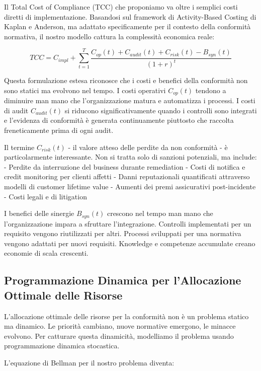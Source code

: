 Il Total Cost of Compliance (TCC) che proponiamo va oltre i semplici costi diretti di implementazione. Basandosi sul framework di Activity-Based Costing di Kaplan e Anderson\autocite{Kaplan2007}, ma adattato specificamente per il contesto della conformità normativa, il nostro modello cattura la complessità economica reale:

\begin{equation}
TCC = C_{impl} + \sum_{t=1}^{T} \frac{C_{op}(t) + C_{audit}(t) + C_{risk}(t) - B_{syn}(t)}{(1+r)^t}
\label{eq:tcc_extended}
\end{equation}

Questa formulazione estesa riconosce che i costi e benefici della conformità non sono statici ma evolvono nel tempo. I costi operativi $C_{op}(t)$ tendono a diminuire man mano che l'organizzazione matura e automatizza i processi. I costi di audit $C_{audit}(t)$ si riducono significativamente quando i controlli sono integrati e l'evidenza di conformità è generata continuamente piuttosto che raccolta freneticamente prima di ogni audit.

Il termine $C_{risk}(t)$ - il valore atteso delle perdite da non conformità - è particolarmente interessante. Non si tratta solo di sanzioni potenziali, ma include:
- Perdite da interruzione del business durante remediation
- Costi di notifica e credit monitoring per clienti affetti
- Danni reputazionali quantificati attraverso modelli di customer lifetime value
- Aumenti dei premi assicurativi post-incidente
- Costi legali e di litigation

I benefici delle sinergie $B_{syn}(t)$ crescono nel tempo man mano che l'organizzazione impara a sfruttare l'integrazione. Controlli implementati per un requisito vengono riutilizzati per altri. Processi sviluppati per una normativa vengono adattati per nuovi requisiti. Knowledge e competenze accumulate creano economie di scala crescenti.

\subsection{Programmazione Dinamica per l'Allocazione Ottimale delle Risorse}

L'allocazione ottimale delle risorse per la conformità non è un problema statico ma dinamico. Le priorità cambiano, nuove normative emergono, le minacce evolvono. Per catturare questa dinamicità, modelliamo il problema usando programmazione dinamica stocastica\autocite{Bertsekas2017}.

L'equazione di Bellman per il nostro problema diventa:

